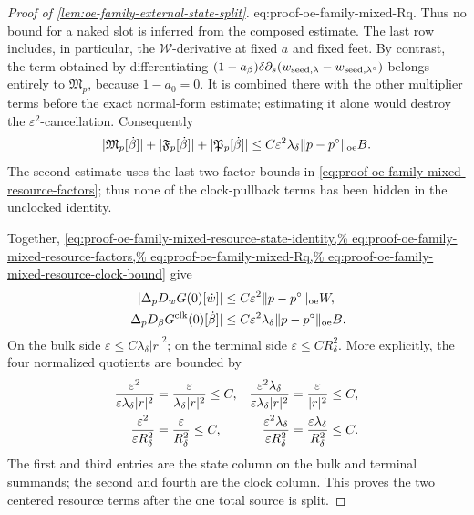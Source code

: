\begin{proof}[Proof of
\cref{lem:oe-family-external-state-split}]
{eq:proof-oe-family-mixed-Rq}.  Thus no bound for a naked slot is inferred
from the composed estimate.  The last row includes, in particular, the
\(\mathscr W\)-derivative at fixed \(a\) and fixed feet.  By contrast, the
term obtained by differentiating
\((1-a_\beta)\delta\partial_s
 (w_{{\rm seed},\lambda}-w_{{\rm seed},\lambda^\circ})\)
belongs entirely to \(\mathfrak M_p\), because \(1-a_0=0\).  It is
combined there with the other multiplier terms before the exact
normal-form estimate; estimating it alone would destroy the
\(\varepsilon^2\)-cancellation.
Consequently
\begin{equation}
 |\mathfrak M_p[\dot\beta]|
 +|\mathfrak F_p[\dot\beta]|
 +|\mathfrak P_p[\dot\beta]|
 \le C\varepsilon^2\lambda_\delta
       \|p-p^\circ\|_{\rm oe}B.                \label{eq:proof-oe-family-mixed-resource-clock-bound}
\end{equation}
The second estimate uses the last two factor bounds in
\cref{eq:proof-oe-family-mixed-resource-factors}; thus none of the
clock-pullback terms has been hidden in the unclocked identity.

Together,
\cref{eq:proof-oe-family-mixed-resource-state-identity,%
eq:proof-oe-family-mixed-resource-factors,%
eq:proof-oe-family-mixed-Rq,%
eq:proof-oe-family-mixed-resource-clock-bound} give
\begin{align}
 |\Delta_pD_wG(0)[\dot w]|
 &\le C\varepsilon^2\|p-p^\circ\|_{\rm oe}W,\notag\\
 |\Delta_pD_\beta G^{\rm clk}(0)[\dot\beta]|
 &\le C\varepsilon^2\lambda_\delta
       \|p-p^\circ\|_{\rm oe}B.                \label{eq:proof-oe-family-mixed-resource-column-bounds}
\end{align}
On the bulk side
\(\varepsilon\le C\lambda_\delta|r|^2\); on the terminal side
\(\varepsilon\le CR_\delta^2\).  More explicitly, the four normalized
quotients are bounded by
\begin{align}
 \frac{\varepsilon^2}
      {\varepsilon\lambda_\delta|r|^2}
 &=\frac{\varepsilon}{\lambda_\delta|r|^2}\le C,
&
 \frac{\varepsilon^2\lambda_\delta}
      {\varepsilon\lambda_\delta|r|^2}
 &=\frac{\varepsilon}{|r|^2}\le C,\notag\\
 \frac{\varepsilon^2}{\varepsilon R_\delta^2}
 &=\frac{\varepsilon}{R_\delta^2}\le C,
&
 \frac{\varepsilon^2\lambda_\delta}
      {\varepsilon R_\delta^2}
 &=\frac{\varepsilon\lambda_\delta}{R_\delta^2}\le C.
                                                        \label{eq:proof-oe-family-mixed-resource-four-quotients}
\end{align}
The first and third entries are the state column on the bulk and terminal
summands; the second and fourth are the clock column.  This proves the two
centered resource terms after the one total source is split.


\end{proof}
